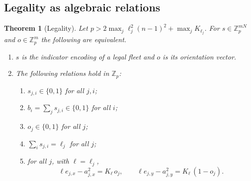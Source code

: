 \documentclass[11pt]{article}
\newtheorem{theorem}[lemma]{Theorem}
\theoremstyle{definition}
\theoremstyle{remark}
\newcommand{\Z}{\mathbb{Z}}
\begin{document}
\subsection{Legality as algebraic relations}\label{sec:legality}
\begin{theorem}[Legality]\label{thm:legality}
Let $p>2\max_j\ell_j^2(n-1)^2+\max_jK_{\ell_j}$. For $s\in\Z_p^{mN}$ and $o\in\Z_p^m$ the following are equivalent.
\begin{enumerate}[label=(\arabic*)]
  \item $s$ is the indicator encoding of a legal fleet and $o$ is its orientation vector.
  \item The following relations hold in $\Z_p$:
  \begin{enumerate}[label=(R\arabic*),leftmargin=3em]
    \item $s_{j,i}\in\{0,1\}$ for all $j,i$;
    \item $b_i=\sum_js_{j,i}\in\{0,1\}$ for all $i$;
    \item $o_j\in\{0,1\}$ for all $j$;
    \item $\sum_is_{j,i}=\ell_j$ for all $j$;
    \item for all $j$, with $\ell=\ell_j$,
    \begin{equation}
      \ell e_{j,x}-a_{j,x}^2=K_\ell\,o_j,\qquad \ell e_{j,y}-a_{j,y}^2=K_\ell\,(1-o_j).
      \label{eq:straight}
    \end{equation}
  \end{enumerate}
\end{enumerate}
\end{theorem}
\end{document}
